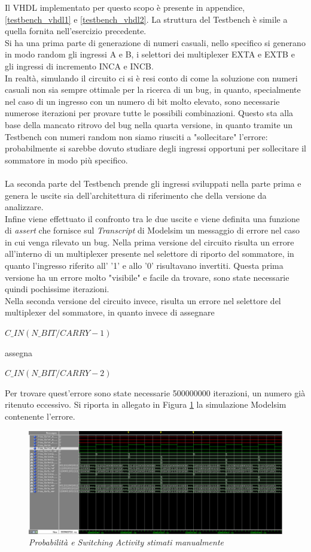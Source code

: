 Il VHDL implementato per questo scopo è presente in appendice, \ref{testbench_vhdl1} e \ref{testbench_vhdl2}.
\newpage
\noindent La struttura del Testbench è simile a quella fornita nell'esercizio precedente.\\
Si ha una prima parte di generazione di numeri casuali, nello specifico si generano in modo random gli ingressi A e B, i selettori dei multiplexer EXTA e EXTB e gli ingressi di incremento INCA e INCB.\\
In realtà, simulando il circuito ci si è resi conto di come la soluzione con numeri casuali non sia sempre ottimale per la ricerca di un bug, in quanto, specialmente nel caso di un ingresso con un numero di bit molto elevato, sono necessarie numerose iterazioni per provare tutte le possibili combinazioni. Questo sta alla base della mancato ritrovo del bug nella quarta versione, in quanto tramite un Testbench con numeri random non siamo riusciti a "sollecitare" l'errore: probabilmente si sarebbe dovuto studiare degli ingressi opportuni per sollecitare il sommatore in modo più specifico.\\
\\
La seconda parte del Testbench prende gli ingressi sviluppati nella parte prima e genera le uscite sia dell'architettura di riferimento che della versione da analizzare.\\
Infine viene effettuato il confronto tra le due uscite e viene definita una funzione di \textit{assert} che fornisce sul \textit{Transcript} di Modelsim un messaggio di errore nel caso in cui venga rilevato un bug.
Nella prima versione del circuito risulta un errore all'interno di un multiplexer presente nel selettore di riporto del sommatore, in quanto l'ingresso riferito all' '1' e allo '0' risultavano invertiti. Questa prima versione ha un errore molto "visibile" e facile da trovare, sono state necessarie quindi pochissime iterazioni.\\
Nella seconda versione del circuito invece, risulta un errore nel selettore del multiplexer del sommatore, in quanto invece di assegnare
\begin{center}
	$C\_IN(N\_BIT/CARRY-1)$
\end{center} 
assegna 
\begin{center}
	$C\_IN(N\_BIT/CARRY-2)$
\end{center}
Per trovare quest'errore sono state necessarie 500000000 iterazioni, un numero già ritenuto eccessivo. Si riporta in allegato in Figura \ref{sim1} la simulazione Modelsim contenente l'errore.
\begin{figure}[!htb]
	\centering
	\includegraphics[scale=0.3]{immagini/sim1}
	\caption{\textit{Probabilità e Switching Activity stimati manualmente}}
	\label{sim1}
\end{figure}
